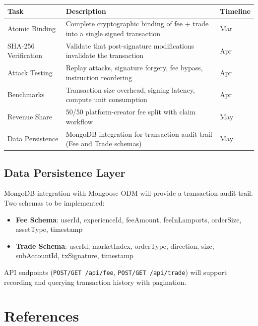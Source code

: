 \documentclass[12pt,a4paper]{article}
\begin{document}
\begin{center}
\begin{tabular}{l p{7cm} l}
\toprule
\textbf{Task} & \textbf{Description} & \textbf{Timeline} \\
\midrule
Atomic Binding & Complete cryptographic binding of fee + trade into a single signed transaction & Mar \\
SHA-256 Verification & Validate that post-signature modifications invalidate the transaction & Apr \\
Attack Testing & Replay attacks, signature forgery, fee bypass, instruction reordering & Apr \\
Benchmarks & Transaction size overhead, signing latency, compute unit consumption & Apr \\
Revenue Share & 50/50 platform-creator fee split with claim workflow & May \\
Data Persistence & MongoDB integration for transaction audit trail (Fee and Trade schemas) & May \\
\bottomrule
\end{tabular}
\end{center}

\subsection{Data Persistence Layer}

MongoDB integration with Mongoose ODM will provide a transaction audit trail. Two schemas to be implemented:

\begin{itemize}
    \item \textbf{Fee Schema}: userId, experienceId, feeAmount, feeInLamports, orderSize, assetType, timestamp
    \item \textbf{Trade Schema}: userId, marketIndex, orderType, direction, size, subAccountId, txSignature, timestamp
\end{itemize}

API endpoints (\texttt{POST/GET /api/fee}, \texttt{POST/GET /api/trade}) will support recording and querying transaction history with pagination.

\section{References}
\end{document}
